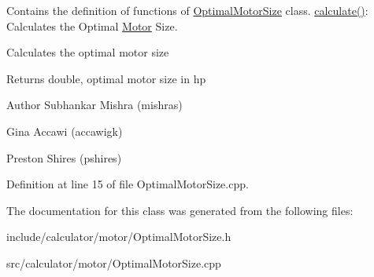 Contains the definition of functions of \hyperlink{class_optimal_motor_size}{Optimal\+Motor\+Size} class. \hyperlink{class_optimal_motor_size_aa9f4e68b9e1807d20e7738cd0789a539}{calculate()}\+: Calculates the Optimal \hyperlink{class_motor}{Motor} Size. 

Calculates the optimal motor size \begin{DoxyReturn}{Returns}
double, optimal motor size in hp
\end{DoxyReturn}
\begin{DoxyAuthor}{Author}
Subhankar Mishra (mishras) 

Gina Accawi (accawigk) 

Preston Shires (pshires) 
\end{DoxyAuthor}


Definition at line 15 of file Optimal\+Motor\+Size.\+cpp.



The documentation for this class was generated from the following files\+:\begin{DoxyCompactItemize}
\item 
include/calculator/motor/Optimal\+Motor\+Size.\+h\item 
src/calculator/motor/Optimal\+Motor\+Size.\+cpp\end{DoxyCompactItemize}
